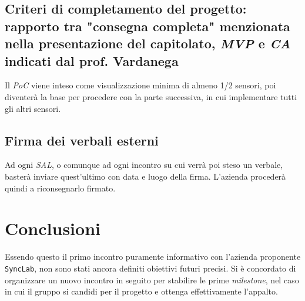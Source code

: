 \subsection{Criteri di completamento del progetto: rapporto tra "consegna completa" menzionata nella presentazione del capitolato, \textit{MVP} e \textit{CA} indicati dal prof. Vardanega}
Il \textit{PoC} viene inteso come visualizzazione minima di almeno 1/2 sensori, poi diventerà la base per procedere con la parte successiva, in cui implementare tutti gli altri sensori.

\subsection{Firma dei verbali esterni}
Ad ogni \textit{SAL}, o comunque ad ogni incontro su cui verrà poi steso un verbale, basterà inviare quest'ultimo con data e luogo della firma. L'azienda procederà quindi a riconsegnarlo firmato.

\section{Conclusioni}
Essendo questo il primo incontro puramente informativo con l'azienda proponente \texttt{SyncLab}, non sono stati ancora definiti obiettivi futuri precisi. Si è concordato di organizzare un nuovo incontro in seguito per stabilire le prime \textit{milestone}, nel caso in cui il gruppo si candidi per il progetto e ottenga effettivamente l'appalto.\\\\



